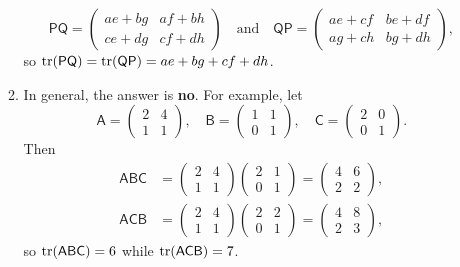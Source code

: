 \begin{enumerate}
\begin{enumerate}
\begin{equation*}
\mathsf{PQ} = \begin{pmatrix} ae + bg & af + bh \\ ce + dg & cf + dh \end{pmatrix}\quad\text{and}\quad\mathsf{QP} = \begin{pmatrix} ae + cf & be + df \\ ag + ch & bg + dh \end{pmatrix},
\end{equation*}
so $\operatorname{tr}(\mathsf{PQ}) = \operatorname{tr}(\mathsf{QP}) = ae + bg + cf + dh$.
\item In general, the answer is \textbf{no}. For example, let
\begin{equation*}
\mathsf{A} = \begin{pmatrix} 2 & 4 \\ 1 & 1 \end{pmatrix},\quad\mathsf{B} = \begin{pmatrix} 1 & 1 \\ 0 & 1 \end{pmatrix},\quad\mathsf{C} = \begin{pmatrix} 2 & 0 \\ 0 & 1 \end{pmatrix}.
\end{equation*}
Then
\begin{align*}
\mathsf{ABC} &= \begin{pmatrix} 2 & 4 \\ 1 & 1 \end{pmatrix}\begin{pmatrix} 2 & 1 \\ 0 & 1 \end{pmatrix} = \begin{pmatrix} 4 & 6 \\ 2 & 2 \end{pmatrix}, \\
\mathsf{ACB} &= \begin{pmatrix} 2 & 4 \\ 1 & 1 \end{pmatrix}\begin{pmatrix} 2 & 2 \\ 0 & 1 \end{pmatrix} = \begin{pmatrix} 4 & 8 \\ 2 & 3 \end{pmatrix},
\end{align*}
so $\operatorname{tr}(\mathsf{ABC}) = 6$ while $\operatorname{tr}(\mathsf{ACB}) = 7$.

\end{enumerate}
\end{enumerate}

